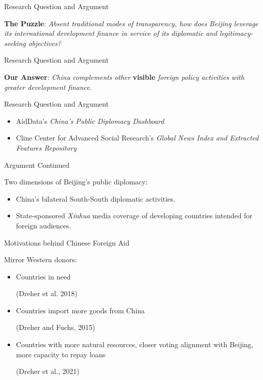 \documentclass{beamer}
\begin{document}
\begin{frame}{Research Question and Argument}

\textbf{The Puzzle}: \textit{Absent traditional modes of transparency, how does Beijing leverage its international development finance in service of its diplomatic and legitimacy-seeking objectives?}

\end{frame}


\begin{frame}{Research Question and Argument}

\textbf{Our Answer}: \textit{China complements other} \textbf{visible} \textit{foreign policy activities with greater development finance.}


\begin{frame}{Research Question and Argument}

\begin{itemize}
  \item AidData's \textit{China's Public Diplomacy Dashboard}
  \item Cline Center for Advanced Social Research's \textit{Global News Index and Extracted Features Repository}
\end{itemize}

\end{frame}


\begin{frame}{Argument Continued}

Two dimensions of Beijing's public diplomacy:

\begin{itemize}
    \item China’s bilateral South-South diplomatic activities.
    \item State-sponsored \textit{Xinhua} media coverage of developing countries intended for foreign audiences.

\end{itemize}
    

\end{frame}



\begin{frame}{Motivations behind Chinese Foreign Aid}


Mirror Western donors:

\begin{itemize}
    \item Countries in need \begin{footnotesize} (Dreher et al. 2018) \end{footnotesize}
    \item Countries import more goods from China \begin{footnotesize} (Dreher and Fuchs, 2015) \end{footnotesize}
    \item Countries with more natural resources, closer voting alignment with Beijing, more capacity to repay loans \begin{footnotesize} (Dreher et al., 2021) \end{footnotesize}
\end{itemize}


\end{frame}
\end{frame}
\end{document}
